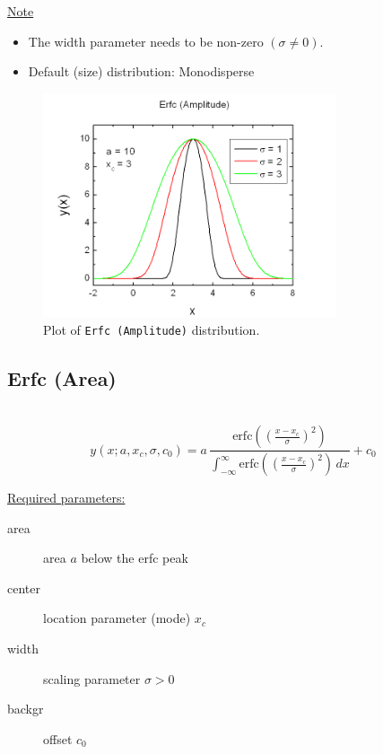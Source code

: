 \uline{Note}
\begin{itemize}
  \item The width parameter needs to be non-zero $(\sigma\neq 0)$.
  \item Default (size) distribution: Monodisperse
\end{itemize}
\begin{figure}[htb]
\begin{center}
\includegraphics[width=0.768\textwidth]{ErfcAmplitude.png}
\end{center}
\caption{Plot of \texttt{Erfc (Amplitude)} distribution.}
\label{fig:ErfcAmplitude}
\end{figure}

\clearpage
\subsection{Erfc (Area)} ~\\
\label{sec:ErfcPeakArea}
\begin{equation}
y(x;a,x_c,\sigma,c_0) = a\, \frac{\textrm{erfc}\left(\left(\frac{x-x_c}{\sigma}\right)^2\right)}{
\int_{-\infty}^{\infty}\textrm{erfc}\left(\left(\frac{x-x_c}{\sigma}\right)^2\right) \, dx}
+c_0
\end{equation}
\vspace{5mm}

\uline{Required parameters:}
\begin{description}
    \item[area] area $a$ below the erfc peak
    \item[center] location parameter (mode) $x_c$
    \item[width] scaling parameter $\sigma>0$
    \item[backgr] offset $c_0$
\end{description}

